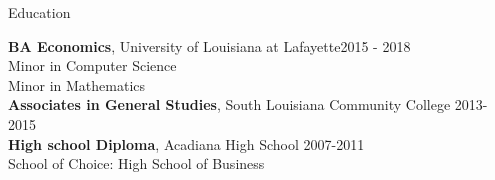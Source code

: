 \documentclass{resume} %
\newcommand{\itab}[1]{\hspace{0em}\rlap{#1}}
\begin{document}

\begin{rSection}{Education}


{\bf BA Economics}, University of Louisiana at Lafayette\hfill {2015 - 2018}\\
{\itab \bfseries \quad Minor in Computer Science \smallskip} \\
{\itab \bfseries \quad Minor in Mathematics \smallskip} \\
{\bf Associates in General Studies}, South Louisiana Community College  \hfill {2013-2015}\\
{\bf High school Diploma}, Acadiana High School \hfill {2007-2011}\\
{\itab \bfseries \quad School of Choice: High School of Business \smallskip}

\end{rSection}
\end{document}
